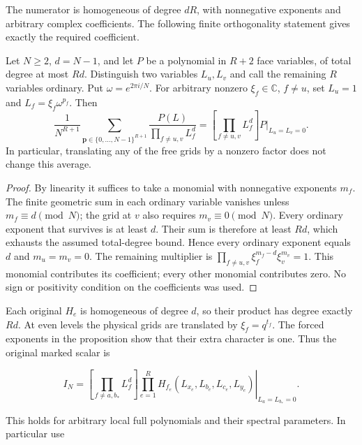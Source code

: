 The numerator is homogeneous of degree \(dR\), with nonnegative
exponents and arbitrary complex coefficients. The following finite
orthogonality statement gives exactly the required coefficient.

\begin{proposition}
\label{mcg:face-grid-selection}
Let \(N\ge2\), \(d=N-1\), and let \(P\) be a polynomial in
\(R+2\) face variables, of total degree at most \(Rd\). Distinguish
two variables \(L_u,L_v\) and call the remaining \(R\) variables
ordinary. Put \(\omega=e^{2\pi i/N}\). For arbitrary nonzero
\(\xi_f\in\mathbb C\), \(f\ne u\), set
\(L_u=1\) and \(L_f=\xi_f\omega^{p_f}\). Then
\[
 \frac1{N^{R+1}}
 \sum_{\boldsymbol p\in\{0,\ldots,N-1\}^{R+1}}
 \frac{P(L)}{\prod_{f\ne u,v}L_f^d}
 =
 [\prod_{f\ne u,v}L_f^d]P\big|_{L_u=L_v=0}.
\]
In particular, translating any of the free grids by a nonzero factor
does not change this average.
\end{proposition}

\begin{proof}
By linearity it suffices to take a monomial with nonnegative exponents
\(m_f\). The finite geometric sum in each ordinary variable vanishes
unless \(m_f\equiv d\pmod N\); the grid at \(v\) also requires
\(m_v\equiv0\pmod N\). Every ordinary exponent that survives is
at least \(d\). Their sum is therefore at least \(Rd\), which
exhausts the assumed total-degree bound. Hence every ordinary exponent
equals \(d\) and \(m_u=m_v=0\). The remaining multiplier is
\(\prod_{f\ne u,v}\xi_f^{m_f-d}\xi_v^{m_v}=1\).
This monomial contributes its coefficient; every other monomial
contributes zero. No sign or positivity condition on the coefficients
was used.
\end{proof}

Each original \(H_e\) is homogeneous of degree \(d\), so their
product has degree exactly \(Rd\). At even levels the physical grids
are translated by \(\xi_f=q^{t_f}\). The forced exponents in the
proposition show that their extra character is one. Thus the original
marked scalar is

\begin{equation}\label{bl:S15}
I_N=\left[\prod_{f\ne a,b_*}L_f^d\right]
 \left.\prod_{e=1}^{R}H_{f_e}
       (L_{x_e},L_{b_e},L_{c_e},L_{y_e})
 \right|_{L_a=L_{b_*}=0}.
\end{equation}

This holds for arbitrary local full polynomials and their spectral parameters. In particular use


